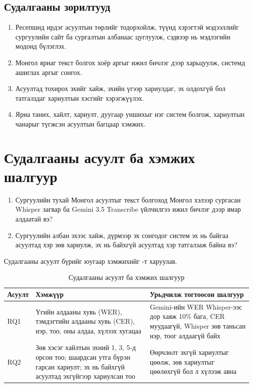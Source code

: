 \subsection{Судалгааны зорилтууд}

\begin{enumerate}
    \item Ресепшнд ирдэг асуултын төрлийг тодорхойлж, түүнд хэрэгтэй мэдээллийг сургуулийн сайт ба сургалтын албанаас цуглуулж, сэдвээр нь мэдлэгийн модонд бүлэглэх.
    \item Монгол яриаг текст болгох хоёр аргыг ижил бичлэг дээр харьцуулж, системд ашиглах аргыг сонгох.
    \item Асуултад тохирох эхийг хайж, эхийн үгээр хариулдаг, эх олдохгүй бол татгалздаг хариултын хэсгийг хэрэгжүүлэх.
    \item Яриа таних, хайлт, хариулт, дуугаар уншихыг нэг систем болгож, хариултын чанарыг түгжсэн асуултын багцаар хэмжих.
\end{enumerate}

\section{Судалгааны асуулт ба хэмжих шалгуур}
\label{sec:rq}

\begin{enumerate}[label=\textbf{RQ\arabic*.}]
    \item Сургуулийн тухай Монгол асуултыг текст болгоход Монгол хэлээр сургасан Whisper загвар ба Gemini 3.5 Transcribe үйлчилгээ ижил бичлэг дээр ямар алдаатай вэ?
    \item Сургуулийн албан эхээс хайж, дүрмээр эх сонгодог систем эх нь байгаа асуултад хэр зөв хариулж, эх нь байхгүй асуултад хэр татгалзаж байна вэ?
\end{enumerate}

Судалгааны асуулт бүрийг юугаар хэмжихийг -т харуулав.

\begin{table}[H]
\centering
\caption{Судалгааны асуулт ба хэмжих шалгуур}
\label{tab:rq_metrics}
\begin{tabular}{|p{1.4cm}|p{6.2cm}|p{6.2cm}|}
\hline
\textbf{Асуулт} & \textbf{Хэмжүүр} & \textbf{Урьдчилж тогтоосон шалгуур} \\
\hline
RQ1 & Үгийн алдааны хувь (\ac{WER}), тэмдэгтийн алдааны хувь (\ac{CER}), нэр, тоо, оны алдаа, хүлээх хугацаа & Gemini-ийн WER Whisper-ээс дор хаяж 10\% бага, CER муудаагүй, Whisper зөв таньсан нэр, тоог алдаагүй байх \\
\hline
RQ2 & Зөв хэсэг хайлтын эхний 1, 3, 5-д орсон тоо; шаардсан утга бүрэн гарсан хариулт; эх нь байхгүй асуултад эхгүйгээр хариулсан тоо & Өөрчлөлт эхгүй хариултыг цөөлж, зөв хариултыг цөөлөхгүй бол л хүлээж авна \\
\hline
\end{tabular}
\end{table}

